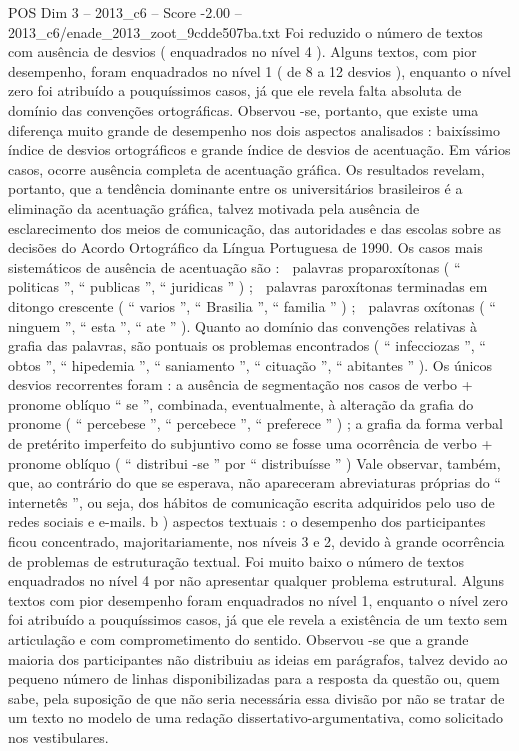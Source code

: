 \begin{textsample}{POS Dim 3 – 2013\_c6 – Score -2.00 – 2013\_c6/enade\_2013\_zoot\_9cdde507ba.txt}
Foi reduzido o número de textos com ausência de desvios ( enquadrados no nível 4 ).
Alguns textos, com pior desempenho, foram enquadrados no nível 1 ( de 8 a 12 desvios ), enquanto o nível zero foi atribuído a pouquíssimos casos, já que ele revela falta absoluta de domínio das convenções ortográficas.
Observou -se, portanto, que existe uma diferença muito grande de desempenho nos dois aspectos analisados : baixíssimo índice de desvios ortográficos e grande índice de desvios de acentuação.
Em vários casos, ocorre ausência completa de acentuação gráfica.
Os resultados revelam, portanto, que a tendência dominante entre os universitários brasileiros é a eliminação da acentuação gráfica, talvez motivada pela ausência de esclarecimento dos meios de comunicação, das autoridades e das escolas sobre as decisões do Acordo Ortográfico da Língua Portuguesa de 1990.
Os casos mais sistemáticos de ausência de acentuação são :  palavras proparoxítonas ( “ politicas ”, “ publicas ”, “ juridicas ” ) ;  palavras paroxítonas terminadas em ditongo crescente ( “ varios ”, “ Brasilia ”, “ familia ” ) ;  palavras oxítonas ( “ ninguem ”, “ esta ”, “ ate ” ).
Quanto ao domínio das convenções relativas à grafia das palavras, são pontuais os problemas encontrados ( “ infecciozas ”, “ obtos ”, “ hipedemia ”, “ saniamento ”, “ cituação ”, “ abitantes ” ).
Os únicos desvios recorrentes foram : a ausência de segmentação nos casos de verbo + pronome oblíquo “ se ”, combinada, eventualmente, à alteração da grafia do pronome ( “ percebese ”, “ percebece ”, “ preferece ” ) ; a grafia da forma verbal de pretérito imperfeito do subjuntivo como se fosse uma ocorrência de verbo + pronome oblíquo ( “ distribui -se ” por “ distribuísse ” ) Vale observar, também, que, ao contrário do que se esperava, não apareceram abreviaturas próprias do “ internetês ”, ou seja, dos hábitos de comunicação escrita adquiridos pelo uso de redes sociais e e-mails. b ) aspectos textuais : o desempenho dos participantes ficou concentrado, majoritariamente, nos níveis 3 e 2, devido à grande ocorrência de problemas de estruturação textual.
Foi muito baixo o número de textos enquadrados no nível 4 por não apresentar qualquer problema estrutural.
Alguns textos com pior desempenho foram enquadrados no nível 1, enquanto o nível zero foi atribuído a pouquíssimos casos, já que ele revela a existência de um texto sem articulação e com comprometimento do sentido.
Observou -se que a grande maioria dos participantes não distribuiu as ideias em parágrafos, talvez devido ao pequeno número de linhas disponibilizadas para a resposta da questão ou, quem sabe, pela suposição de que não seria necessária essa divisão por não se tratar de um texto no modelo de uma redação dissertativo-argumentativa, como solicitado nos vestibulares.

\end{textsample}
